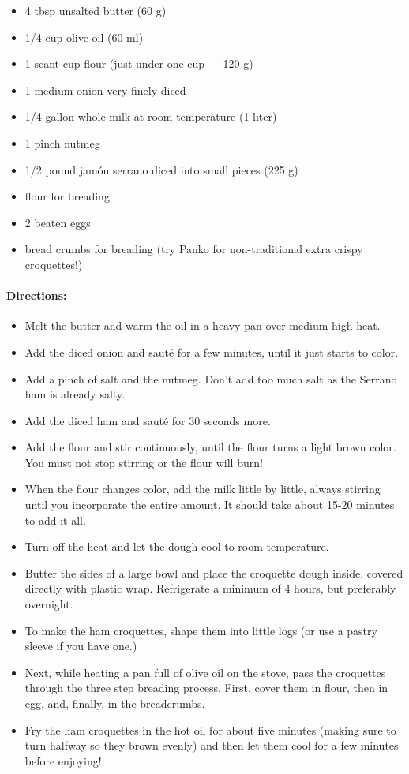 \documentclass{article}
\begin{document}
\begin{itemize}
	\item 4 tbsp unsalted butter (60 g)
	\item 1/4 cup olive oil (60 ml)
	\item 1 scant cup flour (just under one cup — 120 g)
	\item 1 medium onion very finely diced
	\item 1/4 gallon whole milk at room temperature (1 liter)
	\item 1 pinch nutmeg
	\item 1/2 pound jamón serrano diced into small pieces (225 g)
	\item flour for breading
	\item 2 beaten eggs
	\item bread crumbs for breading (try Panko for non-traditional extra crispy croquettes!)
\end{itemize}

\paragraph{Directions:}
\begin{itemize}
	\item Melt the butter and warm the oil in a heavy pan over medium high heat.
	\item Add the diced onion and sauté for a few minutes, until it just starts to color.
	\item Add a pinch of salt and the nutmeg. Don't add too much salt as the Serrano ham is already salty.
	\item Add the diced ham and sauté for 30 seconds more.
	\item Add the flour and stir continuously, until the flour turns a light brown color. You must not stop stirring or the flour will burn!
	\item When the flour changes color, add the milk little by little, always stirring until you incorporate the entire amount. It should take about 15-20 minutes to add it all.
	\item Turn off the heat and let the dough cool to room temperature.
	\item Butter the sides of a large bowl and place the croquette dough inside, covered directly with plastic wrap. Refrigerate a minimum of 4 hours, but preferably overnight.
	\item To make the ham croquettes, shape them into little logs (or use a pastry sleeve if you have one.)
	\item Next, while heating a pan full of olive oil on the stove, pass the croquettes through the three step breading process. First, cover them in flour, then in egg, and, finally, in the breadcrumbs.
	\item Fry the ham croquettes in the hot oil for about five minutes (making sure to turn halfway so they brown evenly) and then let them cool for a few minutes before enjoying!
\end{itemize}
\end{document}
